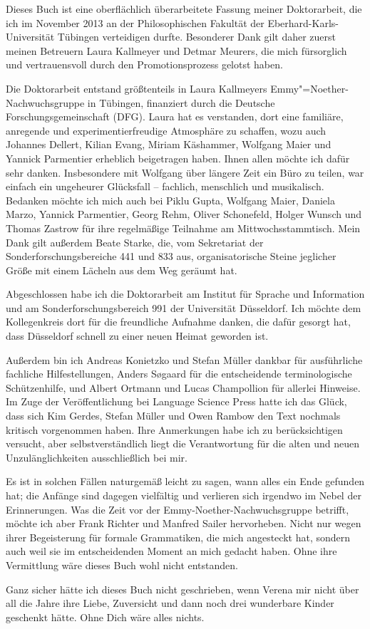 

Dieses Buch ist eine oberflächlich überarbeitete Fassung meiner Doktorarbeit, die ich im November 2013 an der Philosophischen Fakultät der Eberhard-Karls-Universität Tübingen verteidigen durfte. Besonderer Dank gilt daher zuerst meinen Betreuern Laura Kallmeyer und Detmar Meurers, die mich fürsorglich und vertrauensvoll durch den Promotionsprozess gelotst haben. 

Die Doktorarbeit entstand größtenteils in Laura Kallmeyers Emmy"=Noe\-ther-Nachwuchsgruppe in Tübingen, finanziert durch die Deutsche Forschungsgemeinschaft (DFG). Laura hat es verstanden, dort eine familiäre, anregende und experimentierfreudige Atmosphäre zu schaffen, wozu auch Johannes Dellert, Kilian Evang, Miriam Käshammer, Wolfgang Maier und Yannick Parmentier erheblich beigetragen haben. Ihnen allen möchte ich dafür sehr danken. Insbesondere mit Wolfgang über längere Zeit ein Büro zu teilen, war einfach ein ungeheurer Glücksfall -- fachlich, menschlich und musikalisch. Bedanken möchte ich mich auch bei Piklu Gupta, Wolfgang Maier, Daniela Marzo, Yannick Parmentier, Georg Rehm, Oliver Schonefeld, Holger Wunsch und Thomas Zastrow für ihre regelmäßige Teilnahme am Mittwochsstammtisch. Mein Dank gilt außerdem Beate Starke, die, vom Sekretariat der Sonderforschungsbereiche 441 und 833 aus, organisatorische Steine jeglicher Größe mit einem Lächeln aus dem Weg geräumt hat.

Abgeschlossen habe ich die Doktorarbeit am Institut für Sprache und Information und am Sonderforschungsbereich 991 der Universität Düsseldorf. Ich möchte dem Kollegenkreis dort für die freundliche Aufnahme danken, die dafür gesorgt hat, dass Düsseldorf schnell zu einer neuen Heimat geworden ist.    

Außerdem bin ich Andreas Konietzko und Stefan Müller dankbar für ausführliche fachliche Hilfestellungen, Anders S\o{}gaard für die entscheidende terminologische Schützenhilfe, und Albert Ortmann und Lucas Champollion für allerlei Hinweise. Im Zuge der Veröffentlichung bei Language Science Press hatte ich das Glück, dass sich Kim Gerdes, Stefan Müller und Owen Rambow den Text nochmals kritisch vorgenommen haben. Ihre Anmerkungen habe ich zu berücksichtigen versucht, aber selbstverständlich liegt die Verantwortung für die alten und neuen Unzulänglichkeiten ausschließlich bei mir.


Es ist in solchen Fällen naturgemäß leicht zu sagen, wann alles ein Ende gefunden hat; die Anfänge sind dagegen vielfältig und verlieren sich irgendwo im Nebel der Erinnerungen. Was die Zeit vor der Emmy-Noether-Nachwuchsgruppe betrifft, möchte ich aber Frank Richter und Manfred Sailer hervorheben. Nicht nur wegen ihrer Begeisterung für formale Grammatiken, die mich angesteckt hat, sondern auch weil sie im entscheidenden Moment an mich gedacht haben. Ohne ihre Vermittlung wäre dieses Buch wohl nicht entstanden. 

Ganz sicher hätte ich dieses Buch nicht geschrieben, wenn Verena mir nicht
über all die Jahre ihre Liebe, Zuversicht und dann noch drei wunderbare
Kinder geschenkt hätte. Ohne Dich wäre alles nichts.













